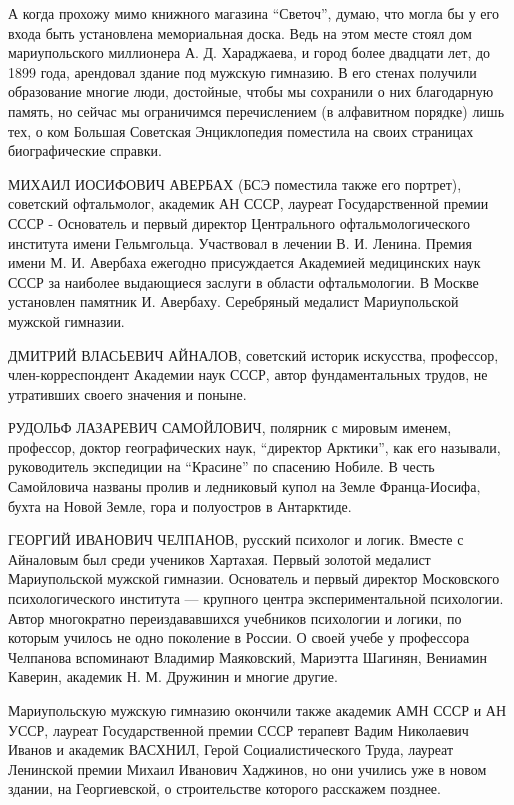 А когда прохожу мимо книжного магазина \enquote{Светоч}, думаю, что могла бы у его
входа быть установлена мемориальная доска. Ведь на этом месте стоял дом
мариупольского миллионера А. Д. Хараджаева, и город более двадцати лет, до
1899 года, арендовал здание под мужскую гимназию. В его стенах получили
образование многие люди, достойные, чтобы мы сохранили о них благодарную
память, но сейчас мы ограничимся перечислением (в алфавитном порядке) лишь
тех, о ком Большая Советская Энциклопедия поместила на своих страницах
биографические справки.
\bigskip

МИХАИЛ ИОСИФОВИЧ АВЕРБАХ (БСЭ поместила также его портрет), советский
офтальмолог, академик АН СССР, лауреат Государственной премии СССР - Основатель и
первый директор Центрального офтальмологического института имени Гельмгольца.
Участвовал в лечении В. И. Ленина. Премия имени М. И. Авербаха ежегодно
присуждается Академией медицинских наук СССР за наиболее выдающиеся заслуги в
области офтальмологии. В Москве установлен памятник И. Авербаху. Серебряный
медалист Мариупольской мужской гимназии.
\bigskip

ДМИТРИЙ ВЛАСЬЕВИЧ АЙНАЛОВ, советский историк искусства, профессор,
член-корреспондент Академии наук СССР, автор фундаментальных трудов, не
утративших своего значения и поныне.
\bigskip

РУДОЛЬФ ЛАЗАРЕВИЧ САМОЙЛОВИЧ, полярник с мировым именем, профессор, доктор
географических наук, \enquote{директор Арктики}, как его называли, руководитель
экспедиции на \enquote{Красине} по спасению Нобиле. В честь Самойловича названы пролив
и ледниковый купол на Земле Франца-Иосифа, бухта на Новой Земле, гора и
полуостров в Антарктиде.
\bigskip

ГЕОРГИЙ ИВАНОВИЧ ЧЕЛПАНОВ, русский психолог и логик. Вместе с Айналовым был
среди учеников Хартахая. Первый золотой медалист Мариупольской мужской
гимна­зии. Основатель и первый директор Московского психологического института
— крупного центра экспериментальной психологии. Автор многократно
переиздававшихся учебников психологии и логики, по которым училось не одно
поколение в России. О своей учебе у профессора Челпанова вспоминают Владимир
Маяковский, Мариэтта Шагинян, Вениамин Каверин, академик Н. М. Дружинин и
многие другие.
\bigskip

Мариупольскую мужскую гимназию окончили также академик АМН СССР и АН УССР,
лауреат Государственной премии СССР терапевт Вадим Николаевич Иванов и академик
ВАСХНИЛ, Герой Социалистического Труда, лауреат Ленинской премии Михаил
Иванович Хаджинов, но они учились уже в новом здании, на Георгиевской, о
строительстве которого расскажем позднее.

